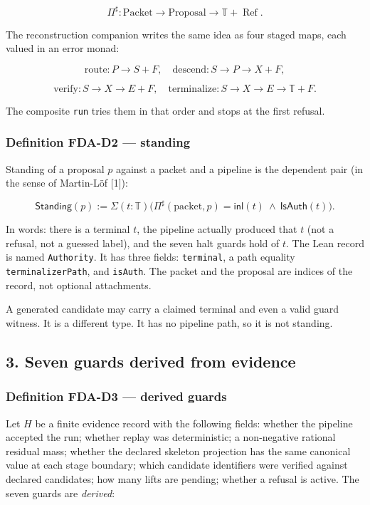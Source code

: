 \documentclass[
  11pt,
]{article}
\begin{document}
\[
\Pi^\sharp
\colon
\mathrm{Packet}\to\mathrm{Proposal}\to\mathbb{T}+\operatorname{Ref}.
\]

The reconstruction companion writes the same idea as four staged maps, each valued in an error monad:

\[
\mathrm{route}\colon P\to S+F,\quad
\mathrm{descend}\colon S\to P\to X+F,
\]

\[
\mathrm{verify}\colon S\to X\to E+F,\quad
\mathrm{terminalize}\colon S\to X\to E\to\mathbb{T}+F.
\]

The composite \texttt{run} tries them in that order and stops at the first refusal.

\subsubsection{Definition FDA-D2 --- standing}\label{definition-fda-d2-standing}

Standing of a proposal \(p\) against a packet and a pipeline is the dependent pair (in the sense of Martin-Löf {[}1{]}):

\[
\mathsf{Standing}(p)
:=
\Sigma(t:\mathbb{T})
\bigl(
\Pi^\sharp(\mathrm{packet},p)=\mathsf{inl}(t)
\ \wedge\
\mathsf{IsAuth}(t)
\bigr).
\]

In words: there is a terminal \(t\), the pipeline actually produced that \(t\) (not a refusal, not a guessed label), and the seven halt guards hold of \(t\). The Lean record is named \texttt{Authority}. It has three fields: \texttt{terminal}, a path equality \texttt{terminalizerPath}, and \texttt{isAuth}. The packet and the proposal are indices of the record, not optional attachments.

A generated candidate may carry a claimed terminal and even a valid guard witness. It is a different type. It has no pipeline path, so it is not standing.

\subsection{3. Seven guards derived from evidence}\label{seven-guards-derived-from-evidence}

\subsubsection{Definition FDA-D3 --- derived guards}\label{definition-fda-d3-derived-guards}

Let \(H\) be a finite evidence record with the following fields: whether the pipeline accepted the run; whether replay was deterministic; a non-negative rational residual mass; whether the declared skeleton projection has the same canonical value at each stage boundary; which candidate identifiers were verified against declared candidates; how many lifts are pending; whether a refusal is active. The seven guards are \emph{derived}:
\end{document}
